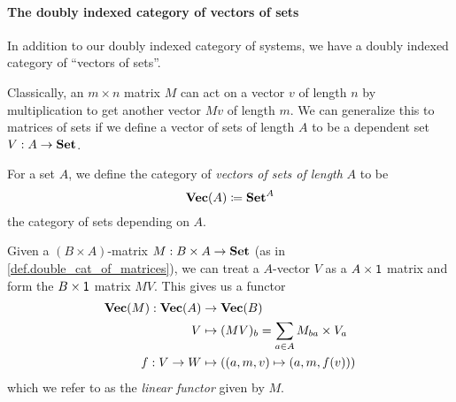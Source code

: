 \documentclass[DynamicalBook]{subfiles}
\begin{document}
\paragraph{The doubly indexed category of vectors of sets}

In addition to our doubly indexed category of systems, we have a doubly indexed
category of ``vectors of sets''. 

Classically, an $m \times n$ matrix $M$ can act on a vector $v$ of length $n$ by multiplication to get
another vector $Mv$ of length $m$. We can generalize this to matrices of sets if
we define a vector of sets of length $A$ to be a dependent set $V : A \to
\textbf{Set}$. 
\begin{definition}\label{def.linear_functor}
  For a set $A$, we define the category of \emph{vectors of sets of length} $A$
  to be $$\textbf{Vec}(A) \coloneqq \textbf{Set}^A$$
the category of sets depending on $A$. 

Given a $(B \times A)$-matrix $M : B \times A \to \textbf{Set}$ (as in \cref{def.double_cat_of_matrices}), we can treat a $A$-vector $V$ as a $A \times
\mathsf{1}$ matrix and form the $B \times \mathsf{1}$ matrix $MV$. This gives us a
functor
\begin{align*}
\textbf{Vec}(M) : \textbf{Vec}(A) &\to \textbf{Vec}(B)\\
               V &\mapsto (MV)_b = \sum_{a \in A} M_{ba} \times V_a \\
           f : V \to W &\mapsto ( (a, m, v) \mapsto (a, m, f(v)) )
\end{align*}
which we refer to as the \emph{linear functor} given by $M$.
\end{definition}
\end{document}
